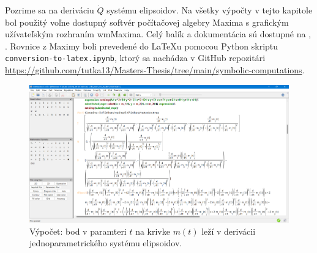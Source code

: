 Pozrime sa na deriváciu $\dot{Q}$ systému elipsoidov.
Na všetky výpočty v tejto kapitole bol použitý voľne dostupný softvér počítačovej algebry Maxima s grafickým užívateľským rozhraním wmMaxima. Celý balík a dokumentácia sú dostupné na \cite{MaximaDoc}, \cite{MaximaDownload}. Rovnice z Maximy boli prevedené do \LaTeX u pomocou Python skriptu \verb|conversion-to-latex.ipynb|, ktorý sa nachádza v GitHub repozitári \url{https://github.com/tutka13/Masters-Thesis/tree/main/symbolic-computations}.

\begin{figure}[h]
	\centering
	\includegraphics[width=\textwidth]{images/maxima.png}
	\caption[Softvér Maxima.]{Výpočet: bod v paramteri $t$ na krivke $m(t)$ leží v derivácii jednoparametrického systému elipsoidov.}
	\label{fig:3D_point_lies}
\end{figure}

